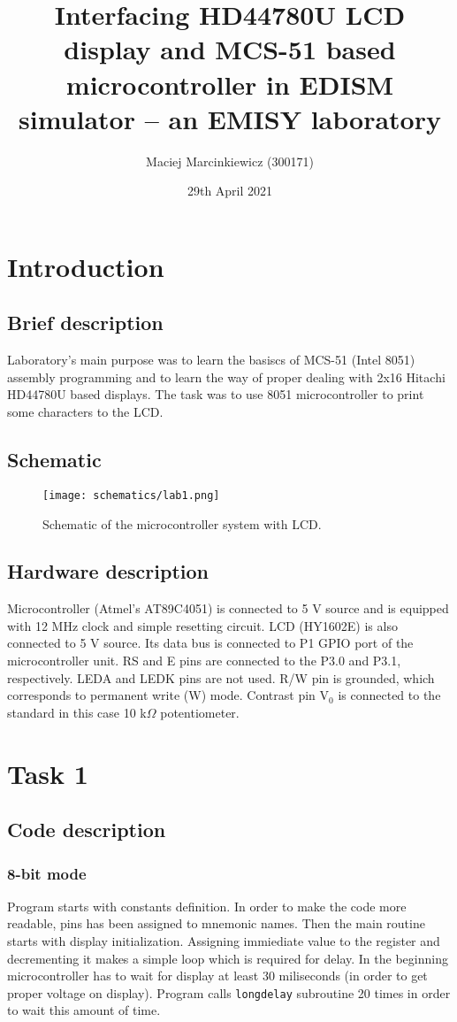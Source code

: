 \documentclass{article}
\title{Interfacing HD44780U LCD display and MCS-51 based microcontroller in EDISM simulator -- an EMISY laboratory}
\author{Maciej Marcinkiewicz (300171)}
\date{29th April 2021}
\begin{document}
\maketitle

\section{Introduction}
\subsection{Brief description}
Laboratory's main purpose was to learn the basiscs of MCS-51 (Intel 8051) assembly
programming and to learn the way of proper dealing with 2x16 Hitachi HD44780U based displays.
The task was to use 8051 microcontroller to print some characters to the LCD.

\subsection{Schematic}
\begin{figure}[h!] %
    \centering
        \texttt{[image: schematics/lab1.png]}
    \caption{Schematic of the microcontroller system with LCD.}
\end{figure}

\subsection{Hardware description}
Microcontroller (Atmel's AT89C4051) is connected to 5 V source and is equipped with 12 MHz clock and 
simple resetting circuit. LCD (HY1602E) is also connected to 5 V source. Its data bus is connected
to P1 GPIO port of the microcontroller unit. RS and E pins are connected to the P3.0 and P3.1,
respectively. LEDA and LEDK pins are not used. R/W pin is grounded, which corresponds to
permanent write (W) mode. Contrast pin V$_0$ is connected to the standard in this case 10 k$\Omega$ potentiometer.

\section{Task 1}
\subsection{Code description}
\subsubsection{8-bit mode}
Program starts with constants definition. In order to make the code more readable,
pins has been assigned to mnemonic names. Then the main routine starts with display
initialization. Assigning immiediate value to the register and decrementing it makes
a simple loop which is required for delay. In the beginning microcontroller has to wait
for display at least 30 miliseconds (in order to get proper voltage on display).
Program calls \texttt{long\textunderscore delay} subroutine 20 times in order to wait this amount of time.
\end{document}
